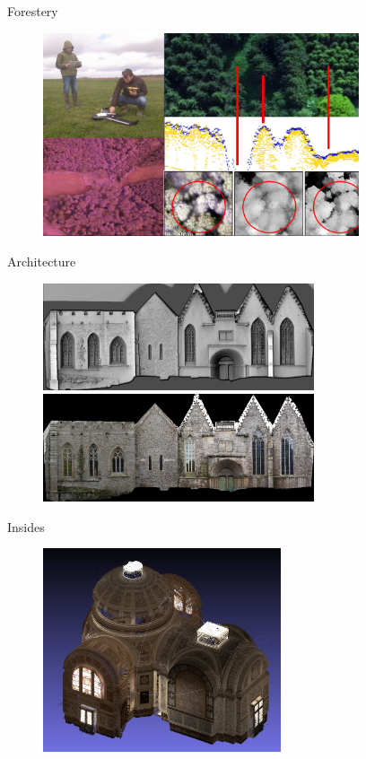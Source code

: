 \documentclass{beamer}
\begin{document}
		\begin{frame}{Forestery}
			 
			\begin{figure}
			  \includegraphics[height=6cm]{../MicmacQuickMay2018/images/usage1}
			\end{figure}
		\end{frame}	
		\begin{frame}{Architecture}
			 
			\begin{figure}
			  \includegraphics[width=8cm]{../MicmacQuickMay2018/images/usage5a}\\
			  \includegraphics[width=8cm]{../MicmacQuickMay2018/images/usage5b}
			\end{figure}
		\end{frame}	
		\begin{frame}{Insides}
			 
			\begin{figure}
			  \includegraphics[height=6cm]{../MicmacQuickMay2018/images/usage3}
			\end{figure}
		\end{frame}	
\end{document}
